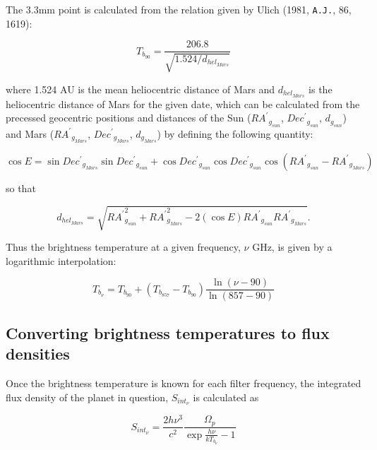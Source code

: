 \documentclass[11pt,twoside]{article}
\newcommand{\xlabel}[1]{}
\renewcommand{\_}{\texttt{\symbol{95}}}
\begin{document}
The 3.3mm point is calculated from the relation given by Ulich (1981, {\tt{A.J.}}, 86, 1619):

\begin{displaymath}
T_{b_{90}} = \frac{206.8}{\sqrt{1.524/d_{hel_{Mars}}}}
\end{displaymath}

where 1.524 AU is the mean heliocentric distance of Mars and $d_{hel_{Mars}}$ is the heliocentric distance of Mars for the given date, which can be calculated from the precessed geocentric positions and distances of the Sun (${RA^\prime}_{g_{sun}}$, ${Dec^\prime}_{g_{sun}}$, $d_{g_{sun}}$) and Mars (${RA^\prime}_{g_{Mars}}$, ${Dec^\prime}_{g_{Mars}}$, $d_{g_{Mars}}$) by defining the following quantity:

\begin{displaymath}
\cos E = \sin {Dec^\prime}_{g_{Mars}} \sin {Dec^\prime}_{g_{sun}} + \cos {Dec^\prime}_{g_{sun}} \cos {Dec^\prime}_{g_{sun}} \cos ({RA^\prime}_{g_{sun}} - {RA^\prime}_{g_{Mars}}) 
\end{displaymath}

so that

\begin{displaymath}
d_{hel_{Mars}} = \sqrt{{RA^\prime}_{g_{sun}}^2 + {RA^\prime}_{g_{Mars}}^2 - 2 (\cos E){RA^\prime}_{g_{sun}}{RA^\prime}_{g_{Mars}}}.
\end{displaymath}

Thus the brightness temperature at a given frequency, $\nu$ GHz, is given by a logarithmic interpolation:

\begin{displaymath}
T_{b_\nu} = T_{b_{90}} + (T_{b_{857}} - T_{b_{90}})\frac{\ln(\nu - 90)}{\ln(857 -90)}
\end{displaymath}

\subsection{Converting brightness temperatures to flux densities}
\xlabel{fluxdensities}
\label{sec:fluxdensities}

Once the brightness temperature is known for each filter frequency, the integrated flux density of the planet in question, $S_{int_\nu}$ is calculated as

\begin{displaymath}
S_{int_\nu} = \frac{2 h \nu^3}{c^2}\frac{ \Omega_p}{\exp{\frac{h \nu}{k T_{b_\nu}}} - 1}
\end{displaymath}
\end{document}
